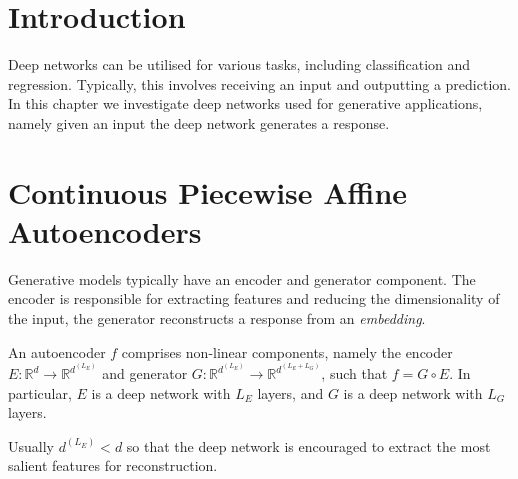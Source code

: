 \section{Introduction}

Deep networks can be utilised for various tasks, including classification and regression. Typically, this involves receiving an input and outputting a prediction. In this chapter we investigate deep networks used for generative applications, namely given an input the deep network generates a response.

\section{Continuous Piecewise Affine Autoencoders}\label{sec:cpa_autoencoders}

Generative models typically have an encoder and generator component. The encoder is responsible for extracting features and reducing the dimensionality of the input, the generator reconstructs a response from an \emph{embedding}.

\begin{definition}
    An autoencoder $f$ comprises non-linear components, namely the encoder $E:\mathbb{R}^d\to\mathbb{R}^{d^{\left(L_E\right)}}$ and generator $G:\mathbb{R}^{d^{\left(L_E\right)}}\to\mathbb{R}^{d^{\left(L_E+L_G\right)}}$, such that $f=G\circ E$. In particular, $E$ is a deep network with $L_E$ layers, and $G$ is a deep network with $L_G$ layers.
\end{definition}

\begin{remark}
    Usually $d^{\left(L_E\right)}<d$ so that the deep network is encouraged to extract the most salient features for reconstruction.
\end{remark}

